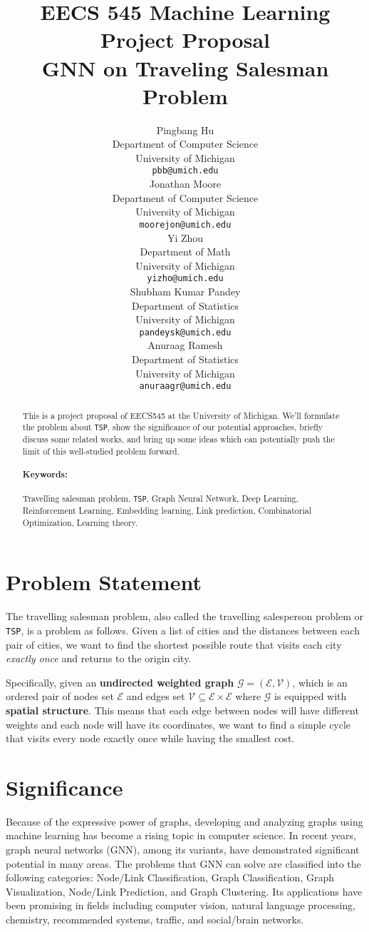\documentclass{article}
\title{EECS 545 Machine Learning\\Project Proposal\\GNN on Traveling Salesman Problem}
\author{%
  Pingbang Hu\\
  Department of Computer Science\\
  University of Michigan\\
  \texttt{pbb@umich.edu} \\
  \And
  Jonathan Moore \\
  Department of Computer Science\\
  University of Michigan\\
  \texttt{moorejon@umich.edu} \\
  \And
  Yi Zhou \\
  Department of Math\\
  University of Michigan\\
  \texttt{yizho@umich.edu} \\
  \And
  Shubham Kumar Pandey \\
  Department of Statistics\\
  University of Michigan\\
  \texttt{pandeysk@umich.edu} \\
  \And
  Anuraag Ramesh \\
  Department of Statistics\\
  University of Michigan\\
  \texttt{anuraagr@umich.edu} \\
}
\begin{document}
\maketitle

\begin{abstract}
  This is a project proposal of EECS545 at the University of Michigan. We'll formulate the problem about \texttt{TSP}, show the significance of our
  potential approaches, briefly discuss some related works, and bring up some ideas which can potentially push the limit of this well-studied problem forward.

  \paragraph{Keywords: }Travelling salesman problem, \texttt{TSP}, Graph Neural Network, Deep Learning, Reinforcement Learning, Embedding learning, Link prediction,
  Combinatorial Optimization, Learning theory.
\end{abstract}

\section{Problem Statement}\label{problem}
The travelling salesman problem, also called the travelling salesperson problem or \texttt{TSP}, is a problem as follows. Given a list of cities and the distances between each pair
of cities, we want to find the shortest possible route that visits each city \emph{exactly once} and returns to the origin city.

Specifically, given an \textbf{undirected weighted graph} \(\mathcal{G} = (\mathcal{E}, \mathcal{V})\), which is an ordered pair of nodes set \(\mathcal{E}\) and edges set
\(\mathcal{V}\subseteq \mathcal{E}\times\mathcal{E}\) where \(\mathcal{G}\) is equipped with \textbf{spatial structure}. This means that each edge between nodes will have
different weights and each node will have its coordinates, we want to find a simple cycle that visits every node exactly once while having the smallest cost.

\section{Significance}\label{significance}
Because of the expressive power of graphs, developing and analyzing graphs using machine learning has become a rising topic in computer science. In recent years, graph neural
networks (GNN), among its variants, have demonstrated significant potential in many areas.\cite{zhou2021graph} The problems that GNN can solve are classified into the following
categories: Node/Link Classification, Graph Classification, Graph Visualization, Node/Link Prediction, and Graph Clustering. Its applications have been promising in fields
including computer vision, natural language processing, chemistry, recommended systems, traffic, and social/brain networks.
\end{document}
